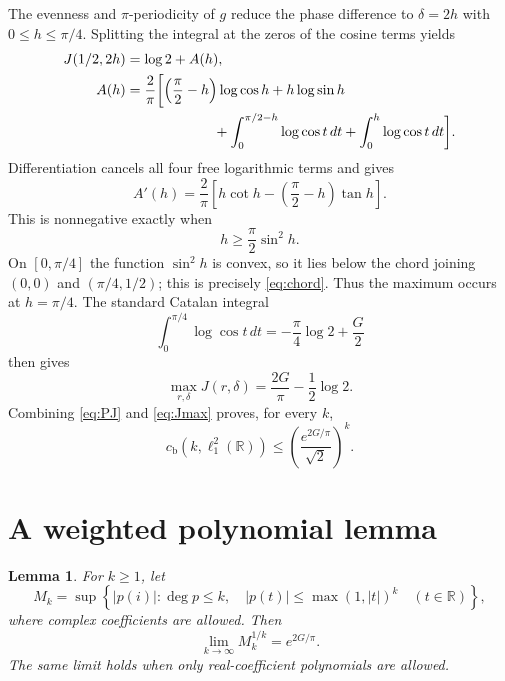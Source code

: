 \documentclass[11pt]{article}
\newtheorem{lemma}{Lemma}
\newcommand{\R}{\mathbb R}
\newcommand{\cb}{c_{\mathrm b}}
\begin{document}
The evenness and $\pi$-periodicity of $g$ reduce the phase difference to
$\delta=2h$ with $0\le h\le\pi/4$.  Splitting the integral at the zeros of
the cosine terms yields
\begin{align*}
 J(1/2,2h)&=\log2+A(h),\\
 A(h)&=\frac2\pi\biggl[
  \left(\frac\pi2-h\right)\log\cos h+h\log\sin h\\
 &\hspace{22mm}+\int_0^{\pi/2-h}\log\cos t\,dt
  +\int_0^h\log\cos t\,dt\biggr].
\end{align*}
Differentiation cancels all four free logarithmic terms and gives
\[
 A'(h)=\frac2\pi\left[h\cot h-\left(\frac\pi2-h\right)\tan h\right].
\]
This is nonnegative exactly when
\begin{equation}\label{eq:chord}
 h\ge\frac\pi2\sin^2h.
\end{equation}
On $[0,\pi/4]$ the function $\sin^2h$ is convex, so it lies below the chord
joining $(0,0)$ and $(\pi/4,1/2)$; this is precisely \eqref{eq:chord}.
Thus the maximum occurs at $h=\pi/4$.  The standard Catalan integral
\[
 \int_0^{\pi/4}\log\cos t\,dt
 =-\frac\pi4\log2+\frac G2
\]
then gives
\begin{equation}\label{eq:Jmax}
 \max_{r,\delta}J(r,\delta)
 =\frac{2G}{\pi}-\frac12\log2.
\end{equation}
Combining \eqref{eq:PJ} and \eqref{eq:Jmax} proves, for every $k$,
\begin{equation}\label{eq:upper}
 \cb(k,\ell_1^2(\R))
 \le\left(\frac{e^{2G/\pi}}{\sqrt2}\right)^k.
\end{equation}

\section{A weighted polynomial lemma}

\begin{lemma}\label{lem:weighted}
For $k\ge1$, let
\[
 M_k=\sup\left\{|p(i)|:\deg p\le k,\quad
 |p(t)|\le\max(1,|t|)^k\quad(t\in\R)\right\},
\]
where complex coefficients are allowed.  Then
\[
 \lim_{k\to\infty}M_k^{1/k}=e^{2G/\pi}.
\]
The same limit holds when only real-coefficient polynomials are allowed.
\end{lemma}
\end{document}
